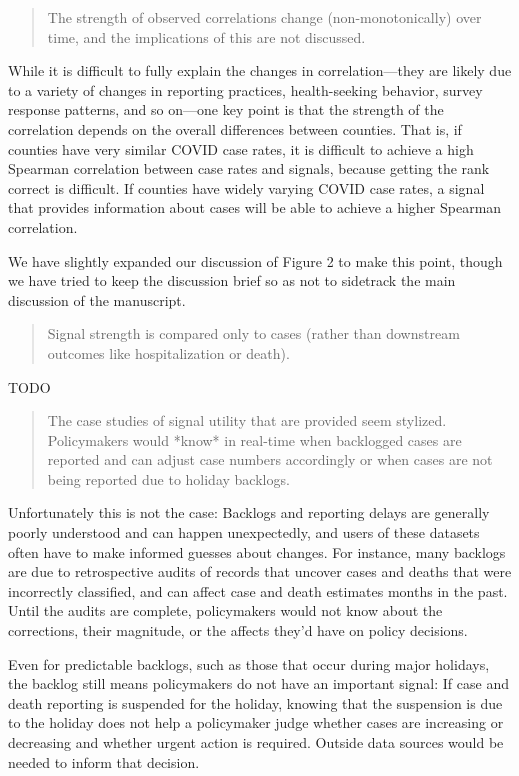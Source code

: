 \documentclass[11pt]{article}
\begin{document}
\begin{quote}
  The strength of observed correlations change (non-monotonically) over time,
  and the implications of this are not discussed.
\end{quote}
While it is difficult to fully explain the changes in correlation---they are
likely due to a variety of changes in reporting practices, health-seeking
behavior, survey response patterns, and so on---one key point is that the
strength of the correlation depends on the overall differences between counties.
That is, if counties have very similar COVID case rates, it is difficult to
achieve a high Spearman correlation between case rates and signals, because
getting the rank correct is difficult. If counties have widely varying COVID
case rates, a signal that provides information about cases will be able to
achieve a higher Spearman correlation.

We have slightly expanded our discussion of Figure 2 to make this point, though
we have tried to keep the discussion brief so as not to sidetrack the main
discussion of the manuscript.

\begin{quote}
  Signal strength is compared only to cases (rather than downstream outcomes
  like hospitalization or death).
\end{quote}
TODO

\begin{quote}
  The case studies of signal utility that are provided seem stylized.
  Policymakers would *know* in real-time when backlogged cases are reported and
  can adjust case numbers accordingly or when cases are not being reported due
  to holiday backlogs.
\end{quote}
Unfortunately this is not the case: Backlogs and reporting delays are generally
poorly understood and can happen unexpectedly, and users of these datasets often
have to make informed guesses about changes. For instance, many backlogs are due
to retrospective audits of records that uncover cases and deaths that were
incorrectly classified, and can affect case and death estimates months in the
past. Until the audits are complete, policymakers would not know about the
corrections, their magnitude, or the affects they'd have on policy decisions.

Even for predictable backlogs, such as those that occur during major holidays,
the backlog still means policymakers do not have an important signal: If case
and death reporting is suspended for the holiday, knowing that the suspension is
due to the holiday does not help a policymaker judge whether cases are
increasing or decreasing and whether urgent action is required. Outside data
sources would be needed to inform that decision.
\end{document}
